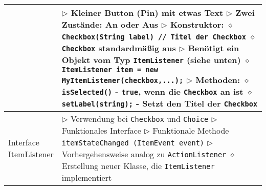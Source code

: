 \begin{longtable}{ | p{} p{} | }
	\makecell[l]{Klasse Checkbox} & \makecell[l]{
	$\triangleright$ Kleiner Button (Pin) mit etwas Text \\
	$\triangleright$ Zwei Zustände: An oder Aus \\
	$\triangleright$ Konstruktor: \\
	\hspace{0.4cm} $\diamond$ \texttt{Checkbox(String label) // Titel der Checkbox} \\
	\hspace{0.4cm} $\diamond$ \texttt{Checkbox} standardmä\ss ig aus \\
	$\triangleright$ Benötigt ein Objekt vom Typ \texttt{ItemListener} (siehe unten) \\
	\hspace{0.4cm} $\diamond$ \texttt{ItemListener item = new MyItemListener(checkbox,...);} \\
	$\triangleright$ Methoden: \\
	\hspace{0.4cm} $\diamond$ \texttt{isSelected()} \\
	\hspace{0.6cm} - \texttt{true}, wenn die \texttt{Checkbox} an ist \\
	\hspace{0.4cm} $\diamond$ \texttt{setLabel(string);} \\
	\hspace{0.6cm} - Setzt den Titel der \texttt{Checkbox}} \\ \hline

	\makecell[l]{Interface \\ ItemListener} & \makecell[l]{
	$\triangleright$ Verwendung bei \texttt{Checkbox} und \texttt{Choice} \\
	$\triangleright$ Funktionales Interface \\
	$\triangleright$ Funktionale Methode \texttt{itemStateChanged (ItemEvent event)} \\
	$\triangleright$ Vorhergehensweise analog zu \texttt{ActionListener} \\
	\hspace{0.4cm} $\diamond$ Erstellung neuer Klasse, die \texttt{ItemListener} implementiert} \\ \hline


\end{longtable}
